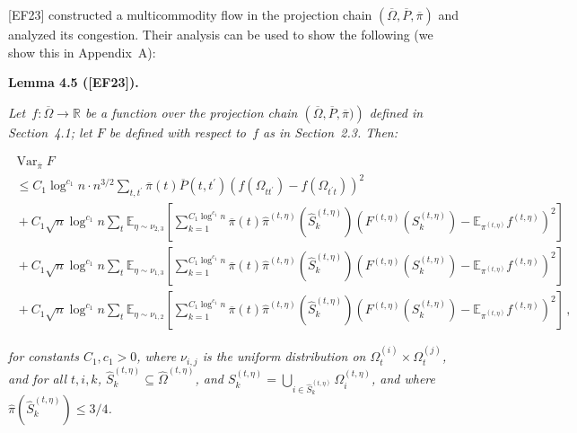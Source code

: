[EF23] constructed a multicommodity flow in the projection chain $(\overline{\Omega},\overline{P},\overline{\pi})$ and analyzed its congestion. Their analysis can be used to show the following (we show this in Appendix A):\par





\par\medskip\noindent\textbf{\textbf{Lemma 4.5}\textbf{ }([EF23])\textbf{.}}\par



\emph{Let $f:\overline{\Omega}\rightarrow\mathbb{R}$ be a function over the projection chain $\left(\overline{\Omega},\overline{P},\overline{\pi})\right)$ defined in Section 4.1; let $F$ be defined with respect to $f$ as in Section 2.3. Then:}\par


\[\begin{gathered}
\displaystyle\operatorname{Var}_{\overline{\pi}}F \\
\displaystyle~\leq C_{1}\log^{c_{1}}n\cdot n^{3/2}\sum_{t,t^{\prime}}\overline{\pi}(t)\overline{P}(t,t^{\prime})(f(\Omega_{tt^{\prime}})-f(\Omega_{t^{\prime}t}))^{2} \\
\displaystyle~+C_{1}\sqrt{n}\log^{c_{1}}n\sum_{t}\mathbb{E}_{\eta\sim\nu_{2,3}}\left[\sum_{k=1}^{C_{1}\log^{c_{1}}n}\overline{\pi}(t)\hat{\pi}^{(t,\eta)}\left(\hat{S}_{k}^{(t,\eta)}\right)\left(F^{(t,\eta)}(S_{k}^{(t,\eta)})-\mathbb{E}_{\pi^{(t,\eta)}}f^{(t,\eta)}\right)^{2}\right] \\
\displaystyle~+C_{1}\sqrt{n}\log^{c_{1}}n\sum_{t}\mathbb{E}_{\eta\sim\nu_{1,3}}\left[\sum_{k=1}^{C_{1}\log^{c_{1}}n}\overline{\pi}(t)\hat{\pi}^{(t,\eta)}\left(\hat{S}_{k}^{(t,\eta)}\right)\left(F^{(t,\eta)}(S_{k}^{(t,\eta)})-\mathbb{E}_{\pi^{(t,\eta)}}f^{(t,\eta)}\right)^{2}\right] \\
\displaystyle~+C_{1}\sqrt{n}\log^{c_{1}}n\sum_{t}\mathbb{E}_{\eta\sim\nu_{1,2}}\left[\sum_{k=1}^{C_{1}\log^{c_{1}}n}\overline{\pi}(t)\hat{\pi}^{(t,\eta)}\left(\hat{S}_{k}^{(t,\eta)}\right)\left(F^{(t,\eta)}(S_{k}^{(t,\eta)})-\mathbb{E}_{\pi^{(t,\eta)}}f^{(t,\eta)}\right)^{2}\right]\,,
\end{gathered}\]


\emph{for constants $C_{1},c_{1}>0$,
where $\nu_{i,j}$ is the uniform distribution on $\Omega_{t}^{(i)}\times\Omega_{t}^{(j)}$, and
for all $t,i,k$, $\hat{S}_{k}^{(t,\eta)}\subseteq\hat{\Omega}^{(t,\eta)}$, and $S_{k}^{(t,\eta)}=\bigcup_{i\in\hat{S}_{k}^{(t,\eta)}}\Omega_{i}^{(t,\eta)}$, and where $\hat{\pi}(\hat{S}_{k}^{(t,\eta)})\leq 3/4$.}\par



